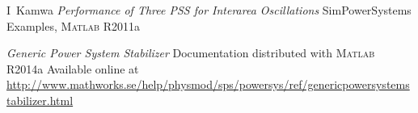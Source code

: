 \documentclass[conference]{IEEEtran}
\begin{document}
\begin{thebibliography}{1}
 I~Kamwa \emph{Performance of Three PSS for Interarea Oscillations} SimPowerSystems Examples, \textsc{Matlab} R2011a

 \emph{Generic Power System Stabilizer} Documentation distributed with \textsc{Matlab} R2014a Available online at \url{http://www.mathworks.se/help/physmod/sps/powersys/ref/genericpowersystemstabilizer.html}

\end{thebibliography}




\end{document}

